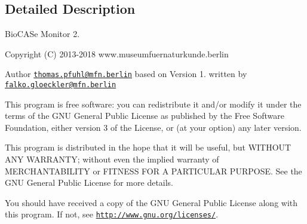 \subsection{Detailed Description}
Bio\+C\+A\+Se Monitor 2. \begin{DoxyCopyright}{Copyright}
(C) 2013-\/2018 www.\+museumfuernaturkunde.\+berlin 
\end{DoxyCopyright}
\begin{DoxyAuthor}{Author}
\href{mailto:thomas.pfuhl@mfn.berlin}{\tt thomas.\+pfuhl@mfn.\+berlin} based on Version 1. written by \href{mailto:falko.gloeckler@mfn.berlin}{\tt falko.\+gloeckler@mfn.\+berlin}
\end{DoxyAuthor}
This program is free software\+: you can redistribute it and/or modify it under the terms of the G\+NU General Public License as published by the Free Software Foundation, either version 3 of the License, or (at your option) any later version.

This program is distributed in the hope that it will be useful, but W\+I\+T\+H\+O\+UT A\+NY W\+A\+R\+R\+A\+N\+TY; without even the implied warranty of M\+E\+R\+C\+H\+A\+N\+T\+A\+B\+I\+L\+I\+TY or F\+I\+T\+N\+E\+SS F\+OR A P\+A\+R\+T\+I\+C\+U\+L\+AR P\+U\+R\+P\+O\+SE. See the G\+NU General Public License for more details.

You should have received a copy of the G\+NU General Public License along with this program. If not, see \href{http://www.gnu.org/licenses/}{\tt http\+://www.\+gnu.\+org/licenses/}. 